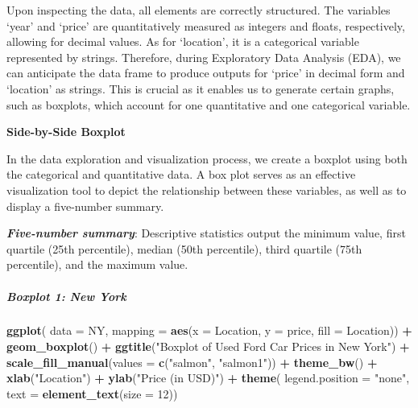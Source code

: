 \documentclass[
]{article}
\newenvironment{Shaded}{\begin{snugshade}}{\end{snugshade}}
\newcommand{\AttributeTok}[1]{\textcolor[rgb]{0.13,0.29,0.53}{#1}}
\newcommand{\DecValTok}[1]{\textcolor[rgb]{0.00,0.00,0.81}{#1}}
\newcommand{\FunctionTok}[1]{\textcolor[rgb]{0.13,0.29,0.53}{\textbf{#1}}}
\newcommand{\NormalTok}[1]{#1}
\newcommand{\SpecialCharTok}[1]{\textcolor[rgb]{0.81,0.36,0.00}{\textbf{#1}}}
\newcommand{\StringTok}[1]{\textcolor[rgb]{0.31,0.60,0.02}{#1}}
\begin{document}
Upon inspecting the data, all elements are correctly structured. The
variables `year' and `price' are quantitatively measured as integers and
floats, respectively, allowing for decimal values. As for `location', it
is a categorical variable represented by strings. Therefore, during
Exploratory Data Analysis (EDA), we can anticipate the data frame to
produce outputs for `price' in decimal form and `location' as strings.
This is crucial as it enables us to generate certain graphs, such as
boxplots, which account for one quantitative and one categorical
variable.

\textbf{Side-by-Side Boxplot}

In the data exploration and visualization process, we create a boxplot
using both the categorical and quantitative data. A box plot serves as
an effective visualization tool to depict the relationship between these
variables, as well as to display a five-number summary.

\textbf{\emph{Five-number summary}}: Descriptive statistics output the
minimum value, first quartile (25th percentile), median (50th
percentile), third quartile (75th percentile), and the maximum value.

\hypertarget{boxplot-1-new-york}{%
\subparagraph{Boxplot 1: New York}\label{boxplot-1-new-york}}

\begin{Shaded}
\begin{Highlighting}[]
\FunctionTok{ggplot}\NormalTok{(}
\AttributeTok{data =}\NormalTok{ NY,}
\AttributeTok{mapping =} \FunctionTok{aes}\NormalTok{(}\AttributeTok{x =}\NormalTok{ Location, }\AttributeTok{y =}\NormalTok{ price, }\AttributeTok{fill =}\NormalTok{ Location)) }\SpecialCharTok{+}
  \FunctionTok{geom\_boxplot}\NormalTok{() }\SpecialCharTok{+}
  \FunctionTok{ggtitle}\NormalTok{(}\StringTok{"Boxplot of Used Ford Car Prices in New York"}\NormalTok{) }\SpecialCharTok{+}
  \FunctionTok{scale\_fill\_manual}\NormalTok{(}\AttributeTok{values =} \FunctionTok{c}\NormalTok{(}\StringTok{"salmon"}\NormalTok{, }\StringTok{"salmon1"}\NormalTok{)) }\SpecialCharTok{+}
  \FunctionTok{theme\_bw}\NormalTok{() }\SpecialCharTok{+}
  \FunctionTok{xlab}\NormalTok{(}\StringTok{"Location"}\NormalTok{) }\SpecialCharTok{+}
  \FunctionTok{ylab}\NormalTok{(}\StringTok{"Price (in USD)"}\NormalTok{) }\SpecialCharTok{+}
  \FunctionTok{theme}\NormalTok{(}
  \AttributeTok{legend.position =} \StringTok{"none"}\NormalTok{,}
  \AttributeTok{text =} \FunctionTok{element\_text}\NormalTok{(}\AttributeTok{size =} \DecValTok{12}\NormalTok{))}
\end{Highlighting}
\end{Shaded}
\end{document}
